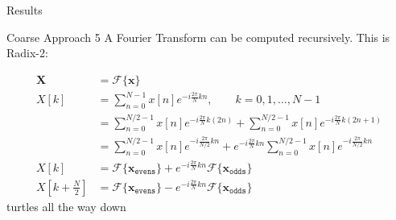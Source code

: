 \begin{frame}{Results}
\end{frame}


\begin{frame}[fragile]{Coarse Approach 5}
	A Fourier Transform can be computed recursively. This is Radix-2:
	
	\begin{align}
		\mathbf{X} &= \mathcal{F}\{\mathbf{x}\}  \\
		X[k] &= \sum_{n=0}^{N-1} x[n] e^{-i\frac{2\pi}{N}kn}, \qquad k=0,1,\ldots,N-1 \\
		&= \sum_{n=0}^{N/2-1} x[n] e^{-i\frac{2\pi}{N}k(2n)} + \sum_{n=0}^{N/2-1} x[n] e^{-i\frac{2\pi}{N}k(2n+1)} \\
		&= \sum_{n=0}^{N/2-1} x[n] e^{-i\frac{2\pi}{N/2}kn} + e^{-i\frac{2\pi}{N}kn} \sum_{n=0}^{N/2-1} x[n] e^{-i\frac{2\pi}{N/2}kn} \\
		X[k] &= \mathcal{F}\{\mathbf{x}_{\texttt{evens}}\}  + e^{-i\frac{2\pi}{N}kn} \mathcal{F}\{\mathbf{x}_{\texttt{odds}}\} \\
		X[k+\frac{N}{2}] &= \mathcal{F}\{\mathbf{x}_{\texttt{evens}}\}  - e^{-i\frac{2\pi}{N}kn} \mathcal{F}\{\mathbf{x}_{\texttt{odds}}\}
	\end{align}
	turtles all the way down
\end{frame}




